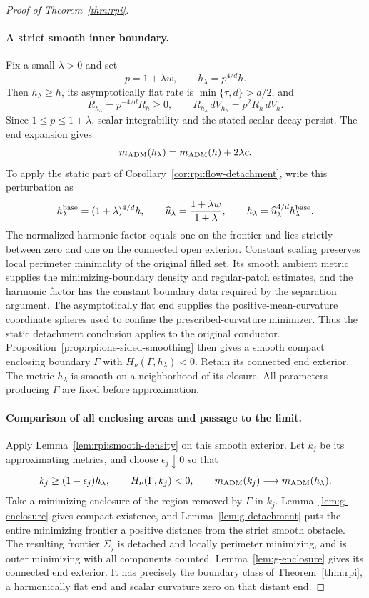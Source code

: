 \begin{proof}[Proof of Theorem~\ref{thm:rpi}]
\paragraph{A strict smooth inner boundary.}
Fix a small \(\lambda>0\) and set
\[
 p=1+\lambda w,\qquad h_\lambda=p^{4/d}h.
\]
Then \(h_\lambda\ge h\), its asymptotically flat rate is
\(\min\{\tau,d\}>d/2\), and
\[
 R_{h_\lambda}=p^{-4/d}R_h\ge0,\qquad
 R_{h_\lambda}\,dV_{h_\lambda}=p^2R_h\,dV_h.
\]
Since $1\le p\le1+\lambda$, scalar integrability and the stated
scalar decay persist. The end expansion gives
\[
 m_{\rm ADM}(h_\lambda)=m_{\rm ADM}(h)+2\lambda c.
\]
To apply the static part of Corollary~\ref{cor:rpi:flow-detachment},
write this perturbation as
\[
 h^{\rm base}_\lambda=(1+\lambda)^{4/d}h,\qquad
 \widehat u_\lambda=\frac{1+\lambda w}{1+\lambda},\qquad
 h_\lambda=\widehat u_\lambda^{4/d}h^{\rm base}_\lambda.
\]
The normalized harmonic factor equals one on the frontier and lies
strictly between zero and one on the connected open exterior.
Constant scaling preserves local perimeter minimality of the original
filled set. Its smooth ambient metric supplies the minimizing-boundary
density and regular-patch estimates, and the harmonic factor has the
constant boundary data required by the separation argument. The
asymptotically flat end supplies the positive-mean-curvature coordinate
spheres used to confine the prescribed-curvature minimizer. Thus the
static detachment conclusion applies to the original conductor.
Proposition~\ref{prop:rpi:one-sided-smoothing} then gives a smooth
compact enclosing boundary $\Gamma$ with
$H_\nu(\Gamma,h_\lambda)<0$.
Retain its connected end exterior.
The metric \(h_\lambda\) is smooth on a neighborhood of its closure.
All parameters producing \(\Gamma\) are fixed before approximation.

\paragraph{Comparison of all enclosing areas and passage to the limit.}
Apply Lemma~\ref{lem:rpi:smooth-density} on this smooth exterior.
Let \(k_j\) be its approximating metrics, and choose
\(\epsilon_j\downarrow0\) so that
\[
 k_j\ge(1-\epsilon_j)h_\lambda,\qquad
 H_\nu(\Gamma,k_j)<0,\qquad
 m_{\rm ADM}(k_j)\longrightarrow m_{\rm ADM}(h_\lambda).
\]
Take a minimizing enclosure of the region removed by
\(\Gamma\) in \(k_j\). Lemma~\ref{lem:g-enclosure} gives compact existence, and
Lemma~\ref{lem:g-detachment} puts the entire minimizing frontier a
positive distance from the strict smooth obstacle. The resulting
frontier \(\Sigma_j\) is detached and locally perimeter minimizing,
and is outer minimizing with all components counted. Lemma~\ref{lem:g-enclosure} gives its connected end exterior. It has precisely the
boundary class of Theorem~\ref{thm:rpi}, a harmonically flat end and
scalar curvature zero on that distant end.


\end{proof}
